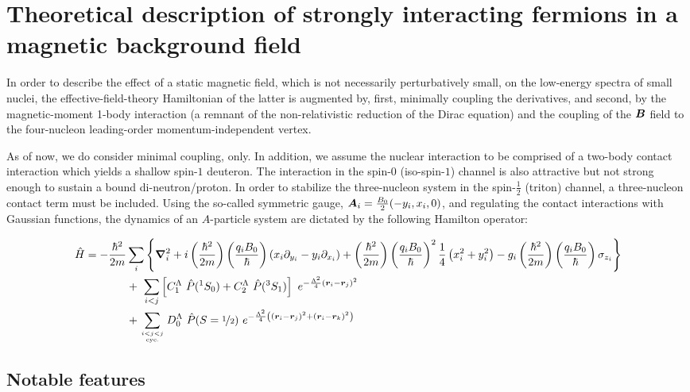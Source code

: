 \documentclass[aps,prd,onecolumn
,tightenlines,letterpaper,notitlepage,
nofootinbib]{revtex4-1}
\begin{document}
\section{Theoretical description of strongly interacting fermions in a magnetic
background field}

In order to describe the effect of a static magnetic field, which is not necessarily
perturbatively small, on the low-energy spectra of small nuclei, the 
effective-field-theory Hamiltonian of the latter is augmented by, first, minimally coupling
the derivatives, and second, by the magnetic-moment 1-body interaction (a remnant of the
non-relativistic reduction of the Dirac equation) and the coupling of the $\boldsymbol{B}$ field
to the four-nucleon leading-order momentum-independent vertex.

As of now, we do consider minimal coupling, only. In addition, we assume the nuclear interaction
to be comprised of a two-body contact interaction which yields a shallow spin-$1$ deuteron. The
interaction in the spin-$0$ (iso-spin-$1$) channel is also attractive but not strong enough to
sustain a bound di-neutron/proton. In order to stabilize the three-nucleon system in the 
spin-$\frac{1}{2}$ (triton) channel, a
three-nucleon contact term must be included. Using the so-called symmetric gauge,
$\boldsymbol{A}_i=\frac{B_0}{2}(-y_i,x_i,0)$,
and regulating the contact interactions with Gaussian functions,
the dynamics of an $A$-particle system are dictated by the following Hamilton operator:

\begin{align}\la{eq.hamiltonian}
\hat{H}=-\frac{\hbar^2}{2m}&\sum_i\Bigg\lbrace
\ve{\nabla}_i^2
+i\left(\frac{\hbar^2}{2m}\right)\left(\frac{q_iB_0}{\hbar}\right)
\left(x_i\partial_{y_i}-y_i\partial_{x_i}\right)
+\left(\frac{\hbar^2}{2m}\right)\left(\frac{q_iB_0}{\hbar}\right)^2\frac{1}{4}
\left(x_i^2+y_i^2\right)
-g_i\left(\frac{\hbar^2}{2m}\right)\left(\frac{q_iB_0}{\hbar}\right)\sigma_{z_i}
\Bigg\rbrace\\
&+~\sum_{i<j}\left[C_1^\Lambda~\hat{P}({}^1S_0) + C_2^\Lambda~\hat{P}({}^3S_1)\right]~e^{-\frac{\Lambda^2}{4}(\ve{r}_i-\ve{r}_j)^2}\nonumber\\
&+\sum_{i<j<j\atop\text{cyc.}}D_0^\Lambda~\hat{P}(S=\nicefrac{1}{2})
~e^{-\frac{\Lambda^2}{4}\left((\ve{r}_i-\ve{r}_j)^2+(\ve{r}_i-\ve{r}_k)^2\right)}
\end{align}

\subsection{Notable features}
\end{document}
